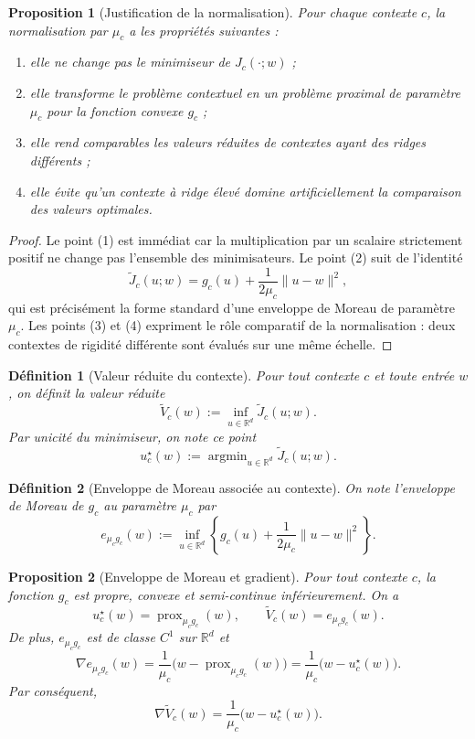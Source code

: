 \documentclass[11pt,a4paper]{article}
\newtheorem{definition}{Définition}[section]
\newtheorem{proposition}{Proposition}[section]
\DeclareMathOperator{\prox}{prox}
\DeclareMathOperator{\argmin}{argmin}
\newcommand{\R}{\mathbb R}
\begin{document}
\begin{proposition}[Justification de la normalisation]
Pour chaque contexte \(c\), la normalisation par \(\mu_c\) a les propriétés suivantes :
\begin{enumerate}[leftmargin=2em]
\item elle ne change pas le minimiseur de \(J_c(\cdot;w)\) ;
\item elle transforme le problème contextuel en un problème proximal de paramètre \(\mu_c\) pour la fonction convexe \(g_c\) ;
\item elle rend comparables les valeurs réduites de contextes ayant des ridges différents ;
\item elle évite qu'un contexte à ridge élevé domine artificiellement la comparaison des valeurs optimales.
\end{enumerate}
\end{proposition}

\begin{proof}
Le point (1) est immédiat car la multiplication par un scalaire strictement positif ne change pas l'ensemble des minimisateurs. Le point (2) suit de l'identité
\[
\widetilde J_c(u;w)=g_c(u)+\frac{1}{2\mu_c}\|u-w\|^2,
\]
qui est précisément la forme standard d'une enveloppe de Moreau de paramètre \(\mu_c\). Les points (3) et (4) expriment le rôle comparatif de la normalisation : deux contextes de rigidité différente sont évalués sur une même échelle.
\end{proof}

\begin{definition}[Valeur réduite du contexte]
Pour tout contexte \(c\) et toute entrée \(w\), on définit la valeur réduite
\[
\widetilde V_c(w)
:=
\inf_{u\in\R^d}\widetilde J_c(u;w).
\]
Par unicité du minimiseur, on note ce point
\[
u_c^\star(w):=\argmin_{u\in\R^d}\widetilde J_c(u;w).
\]
\end{definition}

\begin{definition}[Enveloppe de Moreau associée au contexte]
On note l'enveloppe de Moreau de \(g_c\) au paramètre \(\mu_c\) par
\[
e_{\mu_c g_c}(w)
:=
\inf_{u\in\R^d}
\left\{
g_c(u)+\frac{1}{2\mu_c}\|u-w\|^2
\right\}.
\]
\end{definition}

\begin{proposition}[Enveloppe de Moreau et gradient]
Pour tout contexte \(c\), la fonction \(g_c\) est propre, convexe et semi-continue inférieurement. On a
\[
u_c^\star(w)=\prox_{\mu_c g_c}(w),
\qquad
\widetilde V_c(w)=e_{\mu_c g_c}(w).
\]
De plus, \(e_{\mu_c g_c}\) est de classe \(C^1\) sur \(\R^d\) et
\[
\nabla e_{\mu_c g_c}(w)=\frac{1}{\mu_c}\bigl(w-\prox_{\mu_c g_c}(w)\bigr)
=\frac{1}{\mu_c}\bigl(w-u_c^\star(w)\bigr).
\]
Par conséquent,
\[
\nabla \widetilde V_c(w)=\frac{1}{\mu_c}\bigl(w-u_c^\star(w)\bigr).
\]
\end{proposition}
\end{document}
